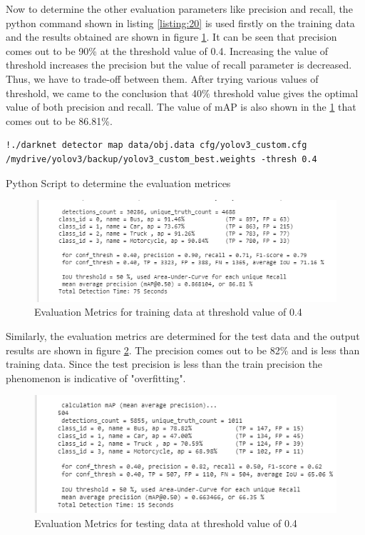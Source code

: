 \noindent Now to determine the other evaluation parameters like precision
and recall, the python command shown in listing \ref{listing:20} is
used firstly on the training data and the results obtained are shown
in figure \ref{fig:5.10}. It can be seen that precision comes out to
be 90\% at the threshold value of 0.4. Increasing the value of threshold 
increases the precision but the value of recall parameter is decreased.
Thus, we have to trade-off between them. After trying various values of 
threshold, we came to the conclusion that 40\% threshold value gives the
optimal value of both precision and recall. The value of mAP is also shown
in the \ref{fig:5.10} that comes out to be 86.81\%.
\begin{longlisting}
\begin{verbatim}
!./darknet detector map data/obj.data cfg/yolov3_custom.cfg 
/mydrive/yolov3/backup/yolov3_custom_best.weights -thresh 0.4
\end{verbatim}
\caption{Python Script to determine the evaluation metrices}
\label{listing:20}
\end{longlisting}
\begin{figure}[H]
\centering
\captionsetup{justification = centering}
\includegraphics[scale= 0.8]{CHAPTERS/Chapter-5/images/5.10.PNG}
\caption{Evaluation Metrics for training data at threshold value of 0.4}
\label{fig:5.10}
\end{figure}
\noindent
Similarly, the evaluation metrics are determined for the test data and the output results are shown in figure \ref{fig:5.11}. The precision comes out to be 82\% and is less than training data. Since the test precision is less than the train precision the phenomenon is indicative of "overfitting".
\begin{figure}[H]
\centering
\captionsetup{justification = centering}
\includegraphics[scale= 0.8]{CHAPTERS/Chapter-5/images/5.11.PNG}
\caption{Evaluation Metrics for testing data at threshold value of 0.4}
\label{fig:5.11}
\end{figure}
